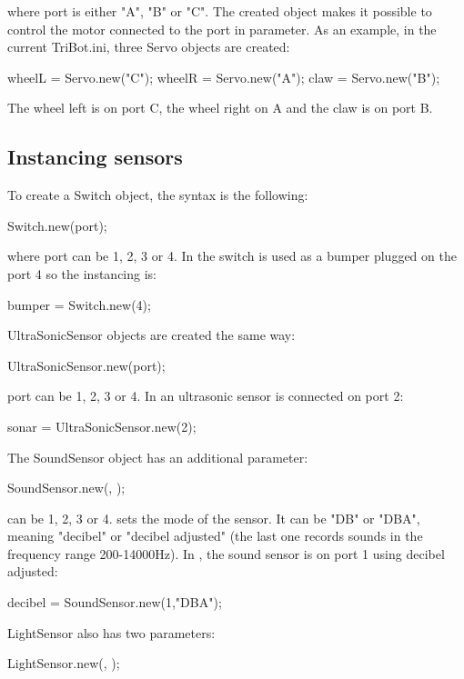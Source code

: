 where port is either "A", "B" or "C". The created object makes it possible to
control the motor connected to the port in parameter.
As an example, in the current TriBot.ini, three Servo objects are created:
\begin{urbiunchecked}
  wheelL = Servo.new("C");
  wheelR = Servo.new("A");
  claw = Servo.new("B");
\end{urbiunchecked}

The wheel left is on port C, the wheel right on A and the claw is on port B.

\subsection{Instancing sensors}
To create a Switch object, the syntax is the following:
\begin{urbiunchecked}
Switch.new(port);
\end{urbiunchecked}

where port can be 1, 2, 3 or 4.
In  the switch is used as a bumper plugged on the port 4 so the
instancing is:
\begin{urbiunchecked}
  bumper  = Switch.new(4);
\end{urbiunchecked}

UltraSonicSensor objects are created the same way:
\begin{urbiunchecked}
UltraSonicSensor.new(port);
\end{urbiunchecked}

port can be 1, 2, 3 or 4.
In  an ultrasonic sensor is connected on port 2:
\begin{urbiunchecked}
  sonar = UltraSonicSensor.new(2);
\end{urbiunchecked}

The SoundSensor object has an additional parameter:
\begin{urbiunchecked}
SoundSensor.new(, );
\end{urbiunchecked}

 can be 1, 2, 3 or 4.   sets the mode of the sensor. It
can be "DB" or "DBA", meaning "decibel" or "decibel adjusted" (the last one
records sounds in the frequency range 200-14000Hz).  In , the
sound sensor is on port 1 using decibel adjusted:
\begin{urbiunchecked}
  decibel = SoundSensor.new(1,"DBA");
\end{urbiunchecked}

LightSensor also has two parameters:
\begin{urbiunchecked}
  LightSensor.new(, );
\end{urbiunchecked}

